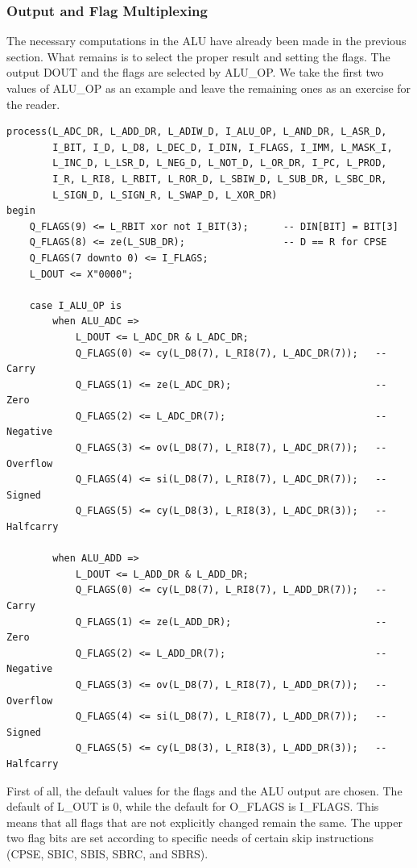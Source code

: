 \documentclass[12pt,a4paper]{report}
\begin{document}
\subsubsection{Output and Flag Multiplexing}
The necessary computations in the ALU have already been made in the previous section. What remains is to select the proper result and setting the flags. The output DOUT and the flags are selected by ALU\_OP. We take the first two values of ALU\_OP as an example and leave the remaining ones as an exercise for the reader.
\begin{lstlisting}
process(L_ADC_DR, L_ADD_DR, L_ADIW_D, I_ALU_OP, L_AND_DR, L_ASR_D,
        I_BIT, I_D, L_D8, L_DEC_D, I_DIN, I_FLAGS, I_IMM, L_MASK_I,
        L_INC_D, L_LSR_D, L_NEG_D, L_NOT_D, L_OR_DR, I_PC, L_PROD,
        I_R, L_RI8, L_RBIT, L_ROR_D, L_SBIW_D, L_SUB_DR, L_SBC_DR,
        L_SIGN_D, L_SIGN_R, L_SWAP_D, L_XOR_DR)
begin
    Q_FLAGS(9) <= L_RBIT xor not I_BIT(3);      -- DIN[BIT] = BIT[3]
    Q_FLAGS(8) <= ze(L_SUB_DR);                 -- D == R for CPSE
    Q_FLAGS(7 downto 0) <= I_FLAGS;
    L_DOUT <= X"0000";

    case I_ALU_OP is
        when ALU_ADC =>
            L_DOUT <= L_ADC_DR & L_ADC_DR;
            Q_FLAGS(0) <= cy(L_D8(7), L_RI8(7), L_ADC_DR(7));   -- Carry
            Q_FLAGS(1) <= ze(L_ADC_DR);                         -- Zero
            Q_FLAGS(2) <= L_ADC_DR(7);                          -- Negative
            Q_FLAGS(3) <= ov(L_D8(7), L_RI8(7), L_ADC_DR(7));   -- Overflow
            Q_FLAGS(4) <= si(L_D8(7), L_RI8(7), L_ADC_DR(7));   -- Signed
            Q_FLAGS(5) <= cy(L_D8(3), L_RI8(3), L_ADC_DR(3));   -- Halfcarry

        when ALU_ADD =>
            L_DOUT <= L_ADD_DR & L_ADD_DR;
            Q_FLAGS(0) <= cy(L_D8(7), L_RI8(7), L_ADD_DR(7));   -- Carry
            Q_FLAGS(1) <= ze(L_ADD_DR);                         -- Zero
            Q_FLAGS(2) <= L_ADD_DR(7);                          -- Negative
            Q_FLAGS(3) <= ov(L_D8(7), L_RI8(7), L_ADD_DR(7));   -- Overflow
            Q_FLAGS(4) <= si(L_D8(7), L_RI8(7), L_ADD_DR(7));   -- Signed
            Q_FLAGS(5) <= cy(L_D8(3), L_RI8(3), L_ADD_DR(3));   -- Halfcarry
\end{lstlisting}
First of all, the default values for the flags and the ALU output are chosen. The default of L\_OUT is 0, while the default for O\_FLAGS is I\_FLAGS. This means that all flags that are not explicitly changed remain the same. The upper two flag bits are set according to specific needs of certain skip instructions (CPSE, SBIC, SBIS, SBRC, and SBRS).\\
\end{document}
